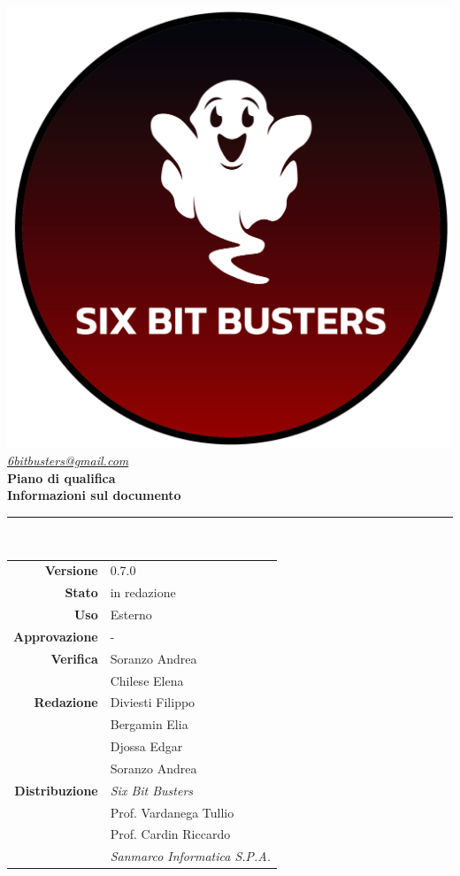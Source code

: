 \thispagestyle{empty}
\renewcommand{\arraystretch}{1.3}


\begin{titlepage}
	\begin{center}
		
	\includegraphics[scale = 0.6]{template/images/logo-circle.png}
	\\[0.8cm]
	\href{mailto:6bitbusters@gmail.com}		      	
	{\large{\textit{6bitbusters@gmail.com} } }\\[0.8cm]
	
	\Huge \textbf{Piano di qualifica} \\[0.5cm]

	\large \textbf{Informazioni sul documento} \\
	\rule{0.6\textwidth}{0.4pt}
	\\[0.5cm]
	\begin{tabular}{r|l}
		\textbf{Versione} & 0.7.0\\
		\textbf{Stato} & in redazione\\
		\textbf{Uso} & Esterno\\                         
		\textbf{Approvazione} & -\\                      
		\textbf{Verifica} & Soranzo Andrea\\ & Chilese Elena\\                         
		\textbf{Redazione} & Diviesti Filippo \\ & Bergamin Elia \\ & Djossa Edgar \\ & Soranzo Andrea \\ 
		\textbf{Distribuzione} & \textit{Six Bit Busters} \\ & Prof. Vardanega Tullio \\ & Prof. Cardin Riccardo \\ & \textit{Sanmarco Informatica S.P.A.}
	\end{tabular}	
	\\[0.8cm]


\end{center}
\end{titlepage}
